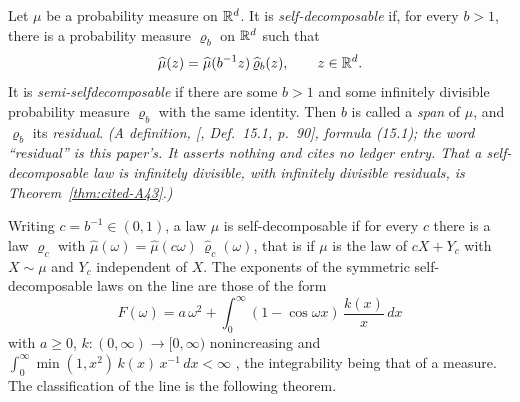 \begin{definition}
\label{def:self-decomposable}
\leanok
Let $\mu$ be a probability measure on $\mathbb{R}^d$. It is \emph{self-decomposable} if, for every
$b > 1$, there is a probability measure $\varrho_b$ on $\mathbb{R}^d$ such that
\[
  \widehat\mu(z) = \widehat\mu(b^{-1}z)\,\widehat\varrho_b(z), \qquad z \in \mathbb{R}^d.
\]
It is \emph{semi-selfdecomposable} if there are some $b > 1$ and some infinitely divisible
probability measure $\varrho_b$ with the same identity. Then $b$ is called a \emph{span} of $\mu$, and
$\varrho_b$ its \emph{residual}.
\statusT\quad\emph{(A definition, [, Def.~15.1, p.~90], formula
(15.1); the
word ``residual'' is this paper's. It asserts nothing and cites no ledger entry. That a
self-decomposable law is infinitely divisible, with infinitely divisible residuals, is
Theorem~\ref{thm:cited-A43}.)}
\end{definition}

Writing $c = b^{-1} \in (0,1)$, a law $\mu$ is self-decomposable if for every $c$ there is a law
$\varrho_c$ with $\widehat\mu(\omega) = \widehat\mu(c\omega)\,\widehat\varrho_c(\omega)$, that is if $\mu$
is the law of $cX + Y_c$ with $X \sim \mu$ and $Y_c$ independent of $X$. The exponents of the
symmetric self-decomposable laws on the line are those of the form
\begin{equation}
\label{eq:admissible-exponent}
\tag{2.0}
  F(\omega) = a\,\omega^2 + \int_0^\infty(1 - \cos\omega x)\,\frac{k(x)}{x}\,dx
\end{equation}
with $a \ge 0$, $k : (0,\infty) \to [0,\infty)$ nonincreasing and
$\int_0^\infty\min(1, x^2)\,k(x)\,x^{-1}\,dx < \infty$ , the
integrability being that of a \Levy{} measure. The classification of the line is the following
theorem.

